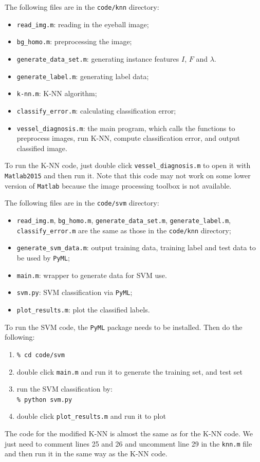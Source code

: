\documentclass[12pt, notitlepage]{article}
\begin{document}
The following files are in the \verb|code/knn| directory:
\begin{itemize}
\item \verb|read_img.m|: reading in the eyeball image;
\item \verb|bg_homo.m|: preprocessing the image;
\item \verb|generate_data_set.m|: generating instance features $I$, $F$ and $\lambda$.
\item \verb|generate_label.m|: generating label data;
\item \verb|k-nn.m|: K-NN algorithm;
\item \verb|classify_error.m|: calculating classification error;
\item \verb|vessel_diagnosis.m|: the main program, which calls the functions to preprocess images, run K-NN, compute classification error, and output classified image. 
\end{itemize}

To run the K-NN code, just double click \verb|vessel_diagnosis.m| to open it with \verb|Matlab2015| and then run it. Note that this code may not work on some lower version of \verb|Matlab| because the image processing toolbox is not available.

The following files are in the \verb|code/svm| directory:
\begin{itemize}
\item \verb|read_img.m|, \verb|bg_homo.m|, \verb|generate_data_set.m|, \verb|generate_label.m|, \verb|classify_error.m| are the same as those in the \verb|code/knn| directory; 
\item \verb|generate_svm_data.m|: output training data, training label and test data to be used by \verb|PyML|;
\item \verb|main.m|: wrapper to generate data for SVM use.
\item \verb|svm.py|: SVM classification via \verb|PyML|;
\item \verb|plot_results.m|: plot the classified labels. 
\end{itemize}


To run the SVM code, the \verb|PyML| package needs to be installed. Then do the following:
\begin{enumerate}
\item  \verb|% cd code/svm|
\item double click \verb|main.m| and run it to generate the training set, and test set
\item run the SVM classification by:  \\
\verb|% python svm.py|
\item double click \verb|plot_results.m| and run it to plot
\end{enumerate}

The code for the modified K-NN is almost the same as for the K-NN code. We just need to comment lines 25 and 26 and uncomment line 29 in the \verb|knn.m| file and then run it in the same way as the K-NN code.




\newpage


%
\end{document}
